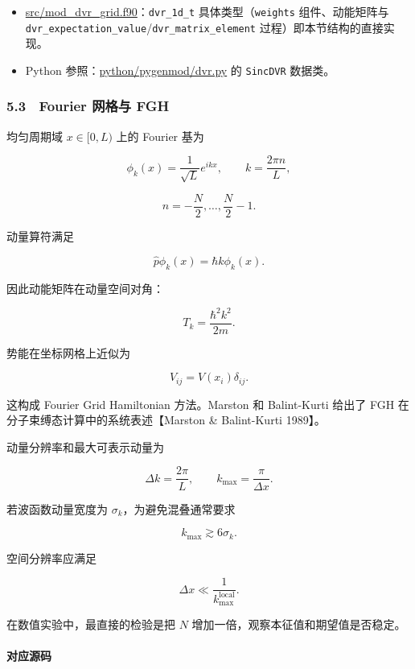 \documentclass[
]{ctexbook}
\providecommand{\tightlist}{%
  \setlength{\itemsep}{0pt}\setlength{\parskip}{0pt}}
\begin{document}
\begin{itemize}
\tightlist
\item
  \href{https://github.com/l1Ha/QuantumGeneralModule/blob/main/src/mod_dvr_grid.f90}{src/mod\_dvr\_grid.f90}：\texttt{dvr\_1d\_t}
  具体类型（\texttt{weights} 组件、动能矩阵与
  \texttt{dvr\_expectation\_value}/\texttt{dvr\_matrix\_element}
  过程）即本节结构的直接实现。
\item
  Python
  参照：\href{https://github.com/l1Ha/QuantumGeneralModule/blob/main/python/pygenmod/dvr.py}{python/pygenmod/dvr.py}
  的 \texttt{SincDVR} 数据类。
\end{itemize}

\hypertarget{fourier-ux7f51ux683cux4e0e-fgh}{%
\subsubsection{5.3　Fourier 网格与
FGH}\label{fourier-ux7f51ux683cux4e0e-fgh}}

均匀周期域 \(x\in[0,L)\) 上的 Fourier 基为

\[
\phi_k(x)=\frac{1}{\sqrt L}e^{ikx},
\qquad
k=\frac{2\pi n}{L},
\]

\[
n=-\frac{N}{2},\ldots,\frac{N}{2}-1.
\]

动量算符满足

\[
\hat p\phi_k(x)=\hbar k\phi_k(x).
\]

因此动能矩阵在动量空间对角：

\[
T_k=\frac{\hbar^2k^2}{2m}.
\]

势能在坐标网格上近似为

\[
V_{ij}=V(x_i)\delta_{ij}.
\]

这构成 Fourier Grid Hamiltonian 方法。Marston 和 Balint-Kurti 给出了 FGH
在分子束缚态计算中的系统表述【Marston \& Balint-Kurti 1989】。

动量分辨率和最大可表示动量为

\[
\Delta k=\frac{2\pi}{L},
\qquad
k_{\max}=\frac{\pi}{\Delta x}.
\]

若波函数动量宽度为 \(\sigma_k\)，为避免混叠通常要求

\[
k_{\max}\gtrsim 6\sigma_k.
\]

空间分辨率应满足

\[
\Delta x
\ll
\frac{1}{k_{\max}^{\mathrm{local}}}.
\]

在数值实验中，最直接的检验是把 \(N\)
增加一倍，观察本征值和期望值是否稳定。

\hypertarget{ux5bf9ux5e94ux6e90ux7801-6}{%
\paragraph{对应源码}\label{ux5bf9ux5e94ux6e90ux7801-6}}
\end{document}
